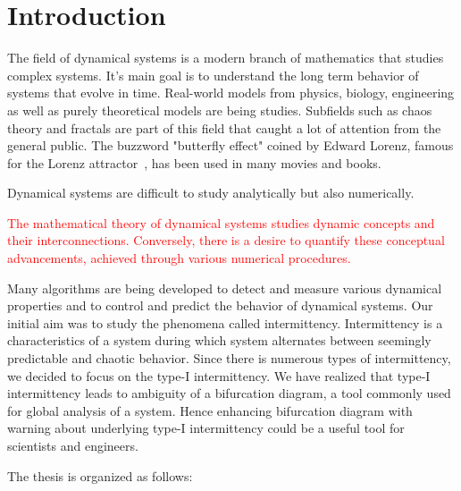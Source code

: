 \chapter{Introduction}
\label{sec:Introduction}

The field of dynamical systems is a modern branch of mathematics that studies complex systems.
It's main goal is to understand the long term behavior of systems that evolve in time.
Real-world models from physics, biology, engineering as well as purely theoretical models are being studies.
Subfields such as chaos theory and fractals are part of this field that caught a lot of attention from the general public.
The buzzword "butterfly effect" coined by Edward Lorenz, famous for the Lorenz attractor~\cite{Lorenz2004}, has been used in many movies and books.
\par
Dynamical systems are difficult to study analytically but also numerically.

\textcolor{red}{
The mathematical theory of dynamical systems studies dynamic concepts and their interconnections.
Conversely, there is a desire to quantify these conceptual advancements, achieved through various numerical procedures.
}


Many algorithms are being developed to detect and measure various dynamical properties and to control and predict the behavior of dynamical systems.
Our initial aim was to study the phenomena called intermittency.
Intermittency is a characteristics of a system during which system alternates between seemingly predictable and chaotic behavior.
Since there is numerous types of intermittency, we decided to focus on the type-I intermittency.
We have realized that type-I intermittency leads to ambiguity of a bifurcation diagram, a tool commonly used for global analysis of a system.
Hence enhancing bifurcation diagram with warning about underlying type-I intermittency could be a useful tool for scientists and engineers.

\bigskip

The thesis is organized as follows:



\endinput